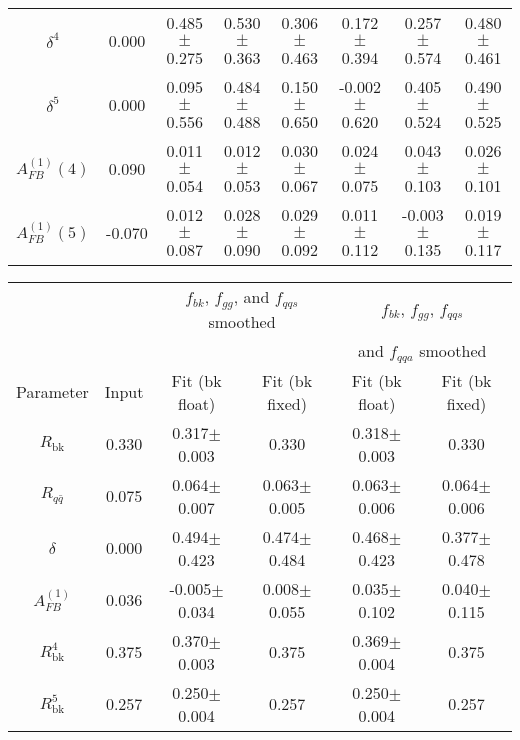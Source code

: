 \documentclass{cmspaperpdf}
\begin{document}
\begin{table}[hbt]
\begin{center}
\begin{tabular}{|c|c|cc|cc|cc|}
$\delta^4$        & 0.000 & 0.485$\pm$0.275  & 0.530$\pm$0.363  & 0.306$\pm$0.463  & 0.172$\pm$0.394       & 0.257$\pm$0.574  & 0.480$\pm$0.461         \\ 
$\delta^5$        & 0.000 & 0.095$\pm$0.556  & 0.484$\pm$0.488  & 0.150$\pm$0.650  & -0.002$\pm$0.620      & 0.405$\pm$0.524  & 0.490$\pm$0.525         \\ 
$A^{(1)}_{FB}(4)$ & 0.090 & 0.011$\pm$0.054  & 0.012$\pm$0.053  & 0.030$\pm$0.067  & 0.024$\pm$0.075       & 0.043$\pm$0.103  & 0.026$\pm$0.101     \\
$A^{(1)}_{FB}(5)$ & -0.070 & 0.012$\pm$0.087 & 0.028$\pm$0.090  & 0.029$\pm$0.092  & 0.011$\pm$0.112       & -0.003$\pm$0.135 & 0.019$\pm$0.117        \\
\hline
\end{tabular}
\vspace{3pt}
\begin{tabular}{|c|c|cc|cc|} \hline
                  &       & \multicolumn{2}{|c|}{$f_{bk}$, $f_{gg}$, and $f_{qqs}$ smoothed} & \multicolumn{2}{|c|}{$f_{bk}$, $f_{gg}$, $f_{qqs}$} \\
                  &       &                  &                                                      & \multicolumn{2}{|c|}{and $f_{qqa}$ smoothed}        \\                                                        
Parameter         & Input & Fit (bk float)   & Fit (bk fixed)                                & Fit (bk float)   & Fit (bk fixed)  \\ 
\hline
$R_\mathrm{bk}$   & 0.330 & 0.317$\pm$0.003  & 0.330                                         & 0.318$\pm$0.003  & 0.330           \\ 
$R_{q\bar q}$     & 0.075 & 0.064$\pm$0.007  & 0.063$\pm$0.005                               & 0.063$\pm$0.006  & 0.064$\pm$0.006 \\ 
$\delta$          & 0.000 & 0.494$\pm$0.423  & 0.474$\pm$0.484                               & 0.468$\pm$0.423  & 0.377$\pm$0.478 \\ 
$A^{(1)}_{FB}$    & 0.036 & -0.005$\pm$0.034 & 0.008$\pm$0.055                               & 0.035$\pm$0.102  & 0.040$\pm$0.115 \\ 
\hline
$R^4_\mathrm{bk}$ & 0.375 & 0.370$\pm$0.003  & 0.375                                         & 0.369$\pm$0.004  & 0.375           \\ 
$R^5_\mathrm{bk}$ & 0.257 & 0.250$\pm$0.004  & 0.257                                         & 0.250$\pm$0.004  & 0.257           \\ 

\end{tabular}
\end{center}
\end{table}
\end{document}

